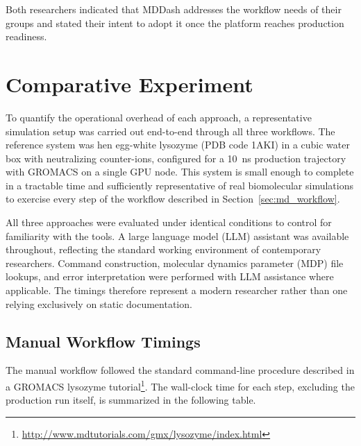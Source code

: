 \documentclass[
  digital,     %
  color,       %
  oneside,     %
  nosansbold,  %
  nocolorbold, %
  lof,         %
  lot,         %
]{fithesis4}
\begin{document}
Both researchers indicated that MDDash addresses the workflow needs of their groups and stated their intent to adopt it once the platform reaches production readiness.

\section{Comparative Experiment}
\label{sec:comparative_experiment}

To quantify the operational overhead of each approach, a representative simulation setup was carried out end-to-end through all three workflows. The reference system was hen egg-white lysozyme (PDB code 1AKI) in a cubic water box with neutralizing counter-ions, configured for a 10~ns production trajectory with GROMACS on a single GPU node. This system is small enough to complete in a tractable time and sufficiently representative of real biomolecular simulations to exercise every step of the workflow described in Section~\ref{sec:md_workflow}.

All three approaches were evaluated under identical conditions to control for familiarity with the tools. A large language model (LLM) assistant was available throughout, reflecting the standard working environment of contemporary researchers. Command construction, molecular dynamics parameter (MDP) file lookups, and error interpretation were performed with LLM assistance where applicable. The timings therefore represent a modern researcher rather than one relying exclusively on static documentation.

\subsection{Manual Workflow Timings}

The manual workflow followed the standard command-line procedure described in a GROMACS lysozyme tutorial\footnote{\url{http://www.mdtutorials.com/gmx/lysozyme/index.html}}. The wall-clock time for each step, excluding the production run itself, is summarized in the following table.
\end{document}

